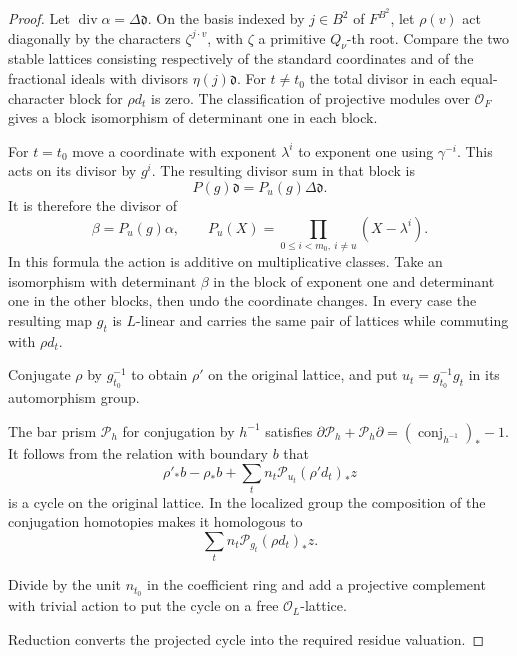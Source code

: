\begin{proof}

Let \(\operatorname{div}\alpha=\Delta\mathfrak d\).
On the basis indexed by \(j\in B^2\) of \(F^{B^2}\),
let \(\rho(v)\) act diagonally by the characters
\(\zeta^{j\cdot v}\), with \(\zeta\) a primitive
\(Q_\nu\)-th root. Compare the two stable lattices
consisting respectively of the standard coordinates
and of the fractional ideals with divisors
\(\eta(j)\mathfrak d\).
For \(t\ne t_0\) the total divisor in each
equal-character block for \(\rho d_t\) is zero.
The classification of projective modules over
\(\mathcal O_F\) gives a block isomorphism
of determinant one in each block.

For \(t=t_0\)
move a coordinate with exponent \(\lambda^i\)
to exponent one using \(\gamma^{-i}\). This acts
on its divisor by \(g^i\).
The resulting divisor sum in that block is
\[
             P(g)\mathfrak d=P_u(g)\Delta\mathfrak d .
\]
It is therefore the divisor of
\[
             \beta=P_u(g)\alpha,\qquad
       P_u(X)=\prod_{0\le i<m_0,\ i\ne u}(X-\lambda^i).
\]
In this formula the action is additive on
multiplicative classes. Take an isomorphism with
determinant \(\beta\) in the block of exponent one
and determinant one in the other blocks, then undo
the coordinate changes. In every case the resulting
map \(g_t\) is \(L\)-linear and carries the same pair
of lattices while commuting with \(\rho d_t\).

Conjugate \(\rho\) by \(g_{t_0}^{-1}\) to obtain
\(\rho'\) on the original lattice, and put
\(u_t=g_{t_0}^{-1}g_t\) in its automorphism group.

The bar prism \(\mathcal P_h\) for conjugation by
\(h^{-1}\) satisfies
\(\partial\mathcal P_h+\mathcal P_h\partial
=(\operatorname{conj}_{h^{-1}})_*-1\).
It follows from the relation with boundary \(b\) that
\[
      \rho'_*b-\rho_*b+
                   \sum_t n_t\mathcal P_{u_t}(\rho'd_t)_*z
\]
is a cycle on the original lattice. In the localized
group the composition of the conjugation homotopies
makes it homologous to
\[
 \sum_t n_t\mathcal P_{g_t}(\rho d_t)_*z.
\]

Divide by the unit \(n_{t_0}\) in the coefficient ring
and add a projective complement with trivial action
to put the cycle on a free \(\mathcal O_L\)-lattice.


Reduction converts the projected cycle into the required residue valuation.



\end{proof}
